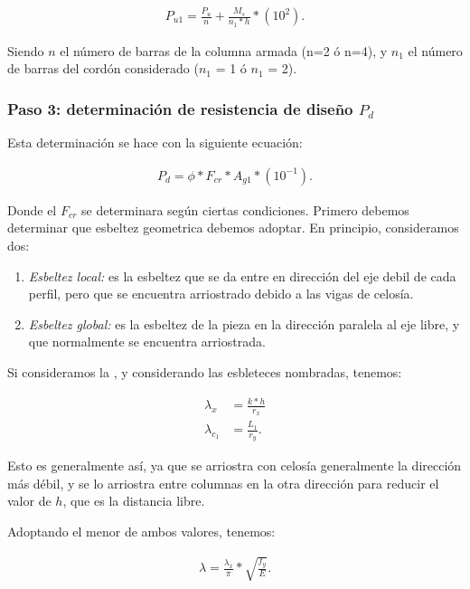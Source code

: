 \documentclass[../main.tex]{subfiles}
\begin{document}
 \begin{align*}
   P_{u1} = \frac{P_u}{n} + \frac{M_s}{n_1*h} * (10^2)
.\end{align*}

Siendo $n$ el número de barras de la columna armada (n=2 ó n=4), y $n_1$ el
número de barras del cordón considerado ($n_1$ = 1 ó $n_1$ = 2).

\subsubsection{Paso 3: determinación de resistencia de diseño $P_d$}

Esta determinación se hace con la siguiente ecuación:

\begin{align*}
  P_d = \phi * F_{cr} * A_{g1} * (10^{-1}) 
.\end{align*}

Donde el $F_{cr}$ se determinara según ciertas condiciones. Primero debemos
determinar que esbeltez geometrica debemos adoptar. En principio, consideramos
dos:

\begin{enumerate}
  \item \textit{Esbeltez local:} es la esbeltez que se da entre en dirección del
    eje debil de cada perfil, pero que se encuentra arriostrado debido a las 
    vigas de celosía. 
  \item \textit{Esbeltez global:} es la esbeltez de la pieza en la dirección
    paralela al eje libre, y que normalmente se encuentra arriostrada.
\end{enumerate}

Si consideramos la , y considerando las esbleteces nombradas,
tenemos:

\begin{align*}
  \lambda_{x} &= \frac{k*h}{r_x} \tag{General} \\[5pt]
  \lambda_{c_1} &= \frac{L_1}{r_y} \tag{Local}
.\end{align*}

Esto es generalmente así, ya que se arriostra con celosía generalmente la
dirección más débil, y se lo arriostra entre columnas en la otra dirección para
reducir el valor de $h$, que es la distancia libre.

Adoptando el menor de ambos valores, tenemos:

\begin{align*}
  \lambda = \frac{\lambda_x}{\pi} * \sqrt{\frac{f_y}{E}}   
.\end{align*}
\end{document}
